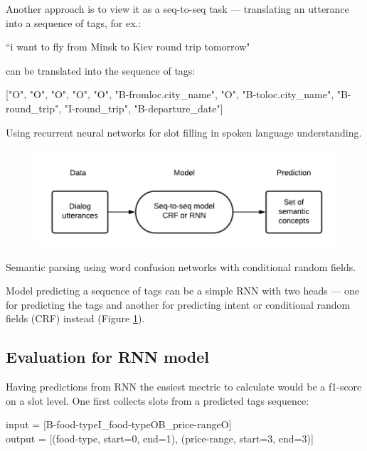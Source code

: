 \documentclass[12pt,titlepage,a4paper]{article}
\begin{document}
Another approach is to view it as a seq-to-seq task ---  translating an utterance into a sequence of tags, for ex.:

\begin{center}
    ``i want to fly from Minsk to Kiev round trip tomorrow" 
\end{center}

can be translated into the sequence of tags: 
\begin{center}
    ["O", "O", "O", "O", "O", "B-fromloc.city\_name", "O", "B-toloc.city\_name", "B-round\_trip", "I-round\_trip", "B-departure\_date"]
\end{center}
Using recurrent neural networks for slot filling in spoken language understanding.

\begin{figure}[!h]
    \centering
    \includegraphics[width=0.91\linewidth]{training-2-2.png}
    \caption{}
    \label{fig:semantic-decoding-seq2seq}
\end{figure}

Semantic parsing using word confusion networks with conditional random fields.

Model predicting a sequence of tags can be a simple RNN \cite{SemanticFilling} with two heads --- one for predicting the tags and another for predicting intent or conditional random fields (CRF) \cite{CRF} instead (Figure \ref{fig:semantic-decoding-seq2seq}).

\subsection{Evaluation for RNN model}

Having predictions from RNN the easiest mectric to calculate would be a f1-score on a slot level. One first collects slots from a predicted tags sequence:
\begin{center}
    input = [B-food-type\quad I\_food-type\quad O\quad B\_price-range\quad O] \\
    output = [(food-type, start=0, end=1), (price-range, start=3, end=3)]
\end{center}
\end{document}
